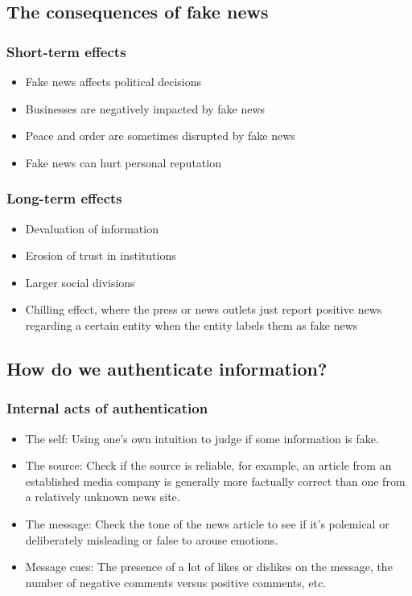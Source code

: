 \documentclass[11pt]{article}
\begin{document}
 \newpage

\subsection{The consequences of fake news}
\label{sec:org682e8f1}

\subsubsection{Short-term effects}
\label{sec:org860fc85}
\begin{itemize}
\item Fake news affects political decisions
\item Businesses are negatively impacted by fake news
\item Peace and order are sometimes disrupted by fake news
\item Fake news can hurt personal reputation
\end{itemize}

\subsubsection{Long-term effects}
\label{sec:org116fb7e}
\begin{itemize}
\item Devaluation of information
\item Erosion of trust in institutions
\item Larger social divisions
\item Chilling effect, where the press or news outlets just report positive news regarding a certain entity when the entity labels them as fake news
\end{itemize}

 \newpage

\subsection{How do we authenticate information?}
\label{sec:org066c164}

\subsubsection{Internal acts of authentication}
\label{sec:orgd200526}
\begin{itemize}
\item The self: Using one's own intuition to judge if some information is fake.
\item The source: Check if the source is reliable, for example, an article from an established media company is generally more factually correct than one from a relatively unknown news site.
\item The message: Check the tone of the news article to see if it's polemical or deliberately misleading or false to arouse emotions.
\item Message cues: The presence of a lot of likes or dislikes on the message, the number of negative comments versus positive comments, etc.
\end{itemize}
\end{document}
